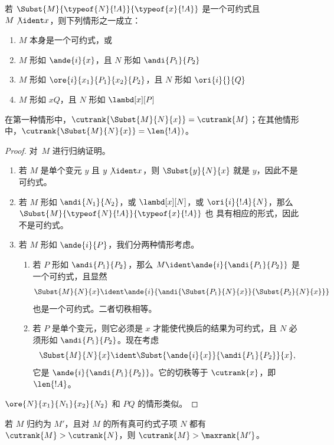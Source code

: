 \documentclass[../../../include/open-logic-section]{subfiles}
\begin{document}
\begin{lem}
  若 $\Subst{M}{\typeof{N}{!A}}{\typeof{x}{!A}}$ 是一个可约式且 $M
  \not\ident x$，则下列情形之一成立：
  \begin{enumerate}
  \item $M$ 本身是一个可约式，或
  \item $M$ 形如 $\ande{i}{x}$，且 $N$ 形如
    $\andi{P_1}{P_2}$
  \item $M$ 形如 $\ore{i}{x_1}{P_1}{x_2}{P_2}$，且 $N$ 形如
    $\ori{i}{}{Q}$
  \item $M$ 形如 $x Q$，且 $N$ 形如
    $\lambd[x][P]$
  \end{enumerate}
  在第一种情形中，$\cutrank{\Subst{M}{N}{x}} = \cutrank{M}$；在其他情形中，$\cutrank{\Subst{M}{N}{x}} = \len{!A})$。
\end{lem}
\begin{proof}
  对~$M$ 进行归纳证明。
  \begin{enumerate}
  \item 若 $M$ 是单个变元 $y$ 且 $y \not\ident x$，则
    $\Subst{y}{N}{x}$ 就是 $y$，因此不是可约式。
  \item 若 $M$ 形如 $\andi{N_1}{N_2}$，或 $\lambd[x][N]$，或
    $\ori{i}{!A}{N}$，那么 $\Subst{M}{\typeof{N}{!A}}{\typeof{x}{!A}}$ 也
    具有相应的形式，因此不是可约式。
  \item 若 $M$ 形如 $\ande{i}{P}$，我们分两种情形考虑。
    \begin{enumerate}
      \item 若 $P$ 形如 $\andi{P_1}{P_2}$，那么 $M \ident
        \ande{i}{\andi{P_1}{P_2}}$ 是一个可约式，且显然
        \[
        \Subst{M}{N}{x} \ident
        \ande{i}{\andi{\Subst{P_1}{N}{x}}{\Subst{P_2}{N}{x}}}
        \]
        也是一个可约式。二者切秩相等。
      \item 若 $P$ 是单个变元，则它必须是 $x$ 才能使代换后的结果为可约式，且 $N$ 必须形如
        $\andi{P_1}{P_2}$。现在考虑
        \[
        \Subst{M}{N}{x} \ident \Subst{\ande{i}{x}}{\andi{P_1}{P_2}}{x},
        \]
        它是 $\ande{i}{\andi{P_1}{P_2}}$。它的切秩等于
        $\cutrank{x}$，即 $\len{!A}$。
    \end{enumerate}
  \end{enumerate}
  $\ore{N}{x_1}{N_1}{x_2}{N_2}$ 和 $P Q$ 的情形类似。
\end{proof}

\begin{lem}
  若 $M$ 归约为 $M'$，且对 $M$ 的所有真可约式子项 $N$ 都有 $\cutrank{M} > \cutrank{N}$，则 $\cutrank{M} >
  \maxrank{M'}$。
\end{lem}
\end{document}
